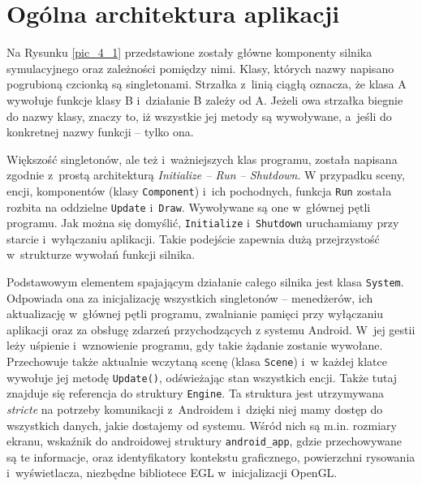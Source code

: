 	\section{Ogólna architektura aplikacji}
	\label{t:praktyka:ogolne}
	
	
	
	Na Rysunku \ref{pic_4_1} przedstawione zostały główne komponenty silnika symulacyjnego oraz zależności pomiędzy nimi. Klasy, których nazwy napisano pogrubioną czcionką są singletonami. Strzałka z~linią ciągłą oznacza, że klasa A wywołuje funkcje klasy B i~działanie B zależy od A. Jeżeli owa strzałka biegnie do nazwy klasy, znaczy to, iż wszystkie jej metody są wywoływane, a~jeśli do konkretnej nazwy funkcji -- tylko ona.
	
	Większość singletonów, ale też i~ważniejszych klas programu, została napisana zgodnie z~prostą architekturą \emph{Initialize -- Run -- Shutdown}. W przypadku sceny, encji, komponentów (klasy \texttt{Component}) i~ich pochodnych, funkcja \texttt{Run} została rozbita na oddzielne \texttt{Update} i~\texttt{Draw}. Wywoływane są one w~głównej pętli programu. Jak można się domyślić, \texttt{Initialize} i~\texttt{Shutdown} uruchamiamy przy starcie i~wyłączaniu aplikacji. Takie podejście zapewnia dużą przejrzystość w~strukturze wywołań funkcji silnika.
	
	Podstawowym elementem spajającym działanie całego silnika jest klasa \texttt{System}. Odpowiada ona za inicjalizację wszystkich singletonów -- menedżerów, ich aktualizację w~głównej pętli programu, zwalnianie pamięci przy wyłączaniu aplikacji oraz za obsługę zdarzeń przychodzących z systemu Android. W~jej gestii leży uśpienie i~wznowienie programu, gdy takie żądanie zostanie wywołane. Przechowuje także aktualnie wczytaną scenę (klasa \texttt{Scene}) i~w każdej klatce wywołuje jej metodę \texttt{Update()}, odświeżając stan wszystkich encji. Także tutaj znajduje się referencja do struktury \texttt{Engine}. Ta struktura jest utrzymywana \emph{stricte} na potrzeby komunikacji z~Androidem i~dzięki niej mamy dostęp do wszystkich danych, jakie dostajemy od systemu. Wśród nich są m.in. rozmiary ekranu, wskaźnik do androidowej struktury \texttt{android\_app}, gdzie przechowywane są te informacje, oraz identyfikatory kontekstu graficznego, powierzchni rysowania i~wyświetlacza, niezbędne bibliotece EGL w~inicjalizacji OpenGL.
	
